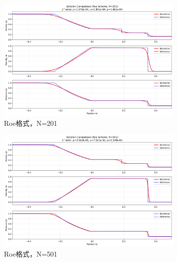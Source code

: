 \documentclass[12pt, a4paper]{article}
\begin{document}
\begin{figure}[htbp]
    \centering
    \begin{subfigure}[b]{0.45\textwidth} 
        \centering
        \includegraphics[width=\textwidth]{./pictures/Solution Comparison (Roe Scheme, N=201).png} 
        \caption{Roe格式，N=201}
    \end{subfigure}
    \hfill
    \begin{subfigure}[b]{0.45\textwidth} 
        \centering
        \includegraphics[width=\textwidth]{./pictures/Solution Comparison (Roe Scheme, N=501).png} 
        \caption{Roe格式，N=501}
    \end{subfigure}
    \vspace{0.5cm}
    \centering
    \begin{subfigure}[b]{0.45\textwidth} 
        \centering

\end{subfigure}
\end{figure}
\end{document}
